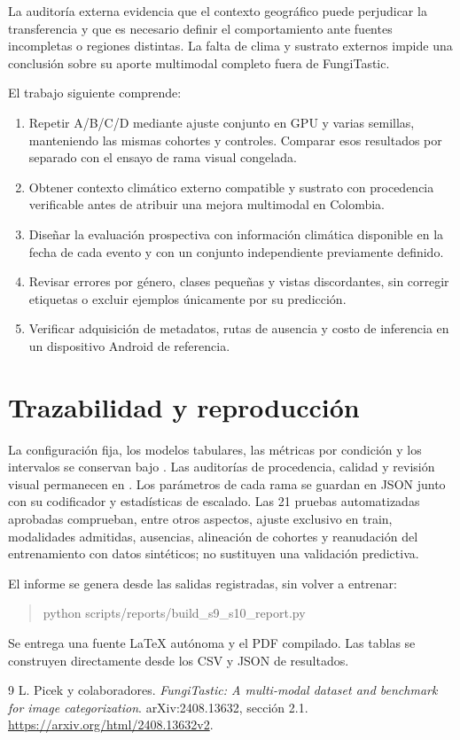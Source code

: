 \documentclass[11pt,a4paper]{article}
\begin{document}
La auditoría externa evidencia que el contexto geográfico puede perjudicar
la transferencia y que es necesario definir el comportamiento ante fuentes
incompletas o regiones distintas. La falta de clima y sustrato externos impide
una conclusión sobre su aporte multimodal completo fuera de FungiTastic.

El trabajo siguiente comprende:
\begin{enumerate}
\item Repetir A/B/C/D mediante ajuste conjunto en GPU y varias semillas,
manteniendo las mismas cohortes y controles. Comparar esos resultados por
separado con el ensayo de rama visual congelada.
\item Obtener contexto climático externo compatible y sustrato con
procedencia verificable antes de atribuir una mejora multimodal en Colombia.
\item Diseñar la evaluación prospectiva con información climática disponible
en la fecha de cada evento y con un conjunto independiente previamente definido.
\item Revisar errores por género, clases pequeñas y vistas discordantes, sin
corregir etiquetas o excluir ejemplos únicamente por su predicción.
\item Verificar adquisición de metadatos, rutas de ausencia y costo de
inferencia en un dispositivo Android de referencia.
\end{enumerate}

\section*{Trazabilidad y reproducción}
La configuración fija, los modelos tabulares, las métricas por condición y
los intervalos se conservan bajo .
Las auditorías de procedencia, calidad y revisión visual permanecen en
. Los parámetros de cada rama se guardan en JSON junto con
su codificador y estadísticas de escalado. Las 21 pruebas automatizadas
aprobadas comprueban, entre otros aspectos, ajuste exclusivo en train,
modalidades admitidas, ausencias, alineación de cohortes y reanudación del
entrenamiento con datos sintéticos; no sustituyen una validación predictiva.

El informe se genera desde las salidas registradas, sin volver a entrenar:
\begin{quote}\small\ttfamily
python scripts/reports/build\_s9\_s10\_report.py
\end{quote}
Se entrega una fuente LaTeX autónoma y el PDF compilado. Las tablas se
construyen directamente desde los CSV y JSON de resultados.

\begin{thebibliography}{9}
L. Picek y colaboradores.
\emph{FungiTastic: A multi-modal dataset and benchmark for image categorization}.
arXiv:2408.13632, sección 2.1.
\url{https://arxiv.org/html/2408.13632v2}.
\end{thebibliography}
\end{document}
